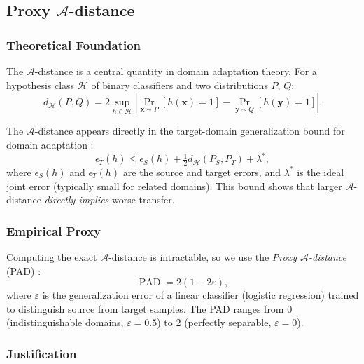 \documentclass[11pt,a4paper]{article}
\DeclareMathOperator{\PAD}{PAD}
\newcommand{\Hcal}{\mathcal{H}}
\theoremstyle{definition}
\begin{document}
\subsection{Proxy $\mathcal{A}$-distance}\label{sec:pad}

\subsubsection{Theoretical Foundation}

The $\mathcal{A}$-distance \cite{ben-david2007,ben-david2010} is a central quantity in domain adaptation theory. For a hypothesis class $\Hcal$ of binary classifiers and two distributions $P$, $Q$:
\begin{equation}\label{eq:a-dist}
  d_\Hcal(P, Q) = 2 \sup_{h \in \Hcal} \left| \Pr_{\bm{x} \sim P}[h(\bm{x}) = 1] - \Pr_{\bm{y} \sim Q}[h(\bm{y}) = 1] \right|.
\end{equation}

The $\mathcal{A}$-distance appears directly in the target-domain generalization bound for domain adaptation \cite{ben-david2010}:
\begin{equation}\label{eq:ben-david-bound}
  \epsilon_T(h) \leq \epsilon_S(h) + \tfrac{1}{2} d_\Hcal(P_S, P_T) + \lambda^*,
\end{equation}
where $\epsilon_S(h)$ and $\epsilon_T(h)$ are the source and target errors, and $\lambda^*$ is the ideal joint error (typically small for related domains). This bound shows that larger $\mathcal{A}$-distance \emph{directly implies} worse transfer.

\subsubsection{Empirical Proxy}

Computing the exact $\mathcal{A}$-distance is intractable, so we use the \emph{Proxy $\mathcal{A}$-distance} (PAD) \cite{ben-david2007}:
\begin{equation}\label{eq:pad}
  \PAD = 2(1 - 2\varepsilon),
\end{equation}
where $\varepsilon$ is the generalization error of a linear classifier (logistic regression) trained to distinguish source from target samples. The PAD ranges from 0 (indistinguishable domains, $\varepsilon = 0.5$) to 2 (perfectly separable, $\varepsilon = 0$).

\subsubsection{Justification}
\end{document}
